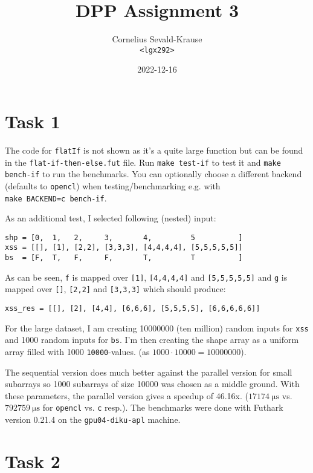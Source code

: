 \documentclass{article}
\begin{document}
\title{DPP Assignment 3}
\author{Cornelius Sevald-Krause \\ \texttt{<lgx292>}}
\date{2022-12-16}
\maketitle

\section*{Task 1}

The code for \verb|flatIf| is not shown as it's a quite large function but can
be found in the \verb|flat-if-then-else.fut| file. Run \verb|make test-if| to
test it and \verb|make bench-if| to run the benchmarks. You can optionally
choose a different backend (defaults to \verb|opencl|) when testing/benchmarking
e.g. with\\ \verb|make BACKEND=c bench-if|.

As an additional test, I selected following (nested) input:
\begin{Verbatim}
shp = [0,  1,   2,     3,       4,         5          ]
xss = [[], [1], [2,2], [3,3,3], [4,4,4,4], [5,5,5,5,5]]
bs  = [F,  T,   F,     F,       T,         T          ]
\end{Verbatim}
As can be seen, \verb|f| is mapped over \verb|[1]|, \verb|[4,4,4,4]| and
\verb|[5,5,5,5,5]| and \verb|g| is mapped over \verb|[]|, \verb|[2,2]| and
\verb|[3,3,3]| which should produce:
\begin{Verbatim}
xss_res = [[], [2], [4,4], [6,6,6], [5,5,5,5], [6,6,6,6,6]]
\end{Verbatim}

For the large dataset, I am creating \num{10000000} (ten million) random inputs
for \verb|xss| and \num{1000} random inputs for \verb|bs|. I'm then creating
the shape array as a uniform array filled with \num{1000} \verb|10000|-values.
(as $\num{1000} \cdot \num{10000} = \num{10000000}$).

The sequential version does much better against the parallel version for small
subarrays so \num{1000} subarrays of size \num{10000} was chosen as a middle
ground. With these parameters, the parallel version gives a speedup of
\textapprox 46.16x. ($\qty{17174}{\micro\second}$ vs.
$\qty{792759}{\micro\second}$ for \verb|opencl| vs. \verb|c| resp.). The
benchmarks were done with Futhark version 0.21.4 on the \verb|gpu04-diku-apl|
machine.

\section*{Task 2}
\end{document}
